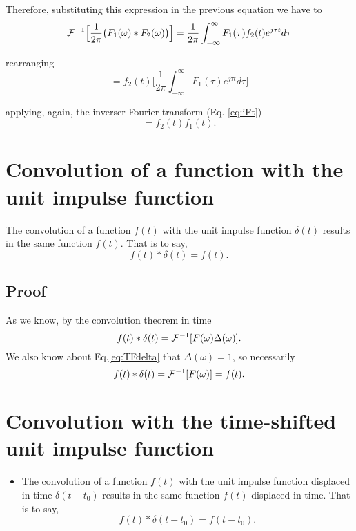 Therefore, substituting this expression in the previous equation we have to
\begin{equation*}
  {\cal F}^{-1}\Big[\displaystyle\frac{1}{2\pi}\big(F_1(\omega)*F_2(\omega)\big)\Big] = 
  \displaystyle\frac{1}{2\pi}\displaystyle\int_{-\infty}^\infty
  F_1(\tau)f_2(t)e^{j\tau t}d\tau
\end{equation*}

rearranging
\begin{equation*}
= f_2(t)\Big[\displaystyle\frac{1}{2\pi}\displaystyle\int_{-\infty}^\infty
  F_1(\tau)e^{j\tau t}d\tau\Big]
\end{equation*}

applying, again, the inverser Fourier transform (Eq. \ref{eq:iFt})
\begin{equation*}
= f_2(t)f_1(t).
\end{equation*}

\section{Convolution of a function with the unit impulse function}

\noindent The convolution of a function $f(t)$ with the unit impulse
function $\delta(t)$ results in the same function $f(t)$. That is to
say,
\begin{equation*}
  f(t)*\delta(t) = f(t).
\end{equation*}

\subsection*{Proof}
\noindent As we know, by the convolution theorem in time
\begin{equation*}
  f(t)*\delta(t)={\cal F}^{-1}[F(\omega)\Delta(\omega)].
\end{equation*}
We also know about Eq.\ref{eq:TFdelta} that $\Delta(\omega)=1$, so necessarily
\begin{equation*}
  f(t)*\delta(t)={\cal F}^{-1}[F(\omega)] = f(t).
\end{equation*}

\section{Convolution with the time-shifted unit impulse function}
\begin{itemize}
\item The convolution of a function $f(t)$ with the unit impulse
  function displaced in time $\delta(t-t_0)$ results in the same
  function $f(t)$ displaced in time. That is to say,
  \begin{equation}
    f(t)*\delta(t-t_0) = f(t-t_0).
    \tag{$f(t)*\delta(t-t_0)$}
    \label{eq:convol_delta}
  \end{equation}
\end{itemize}

